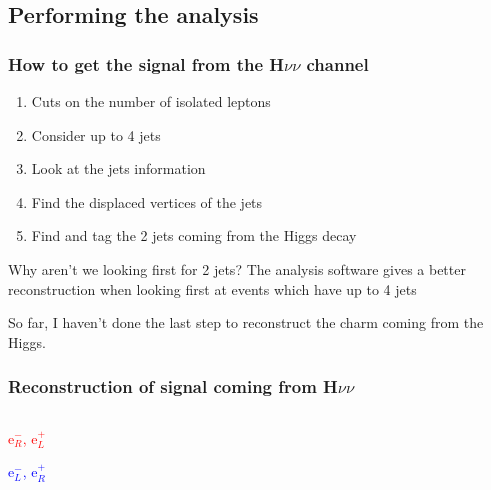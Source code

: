 \documentclass{beamer}
\newcommand{\grille}{
    \begin{tikzpicture}[overlay,remember picture]
        \begin{scope}[shift={(current page.south west)}]
            \draw[gray!50] (0,0) grid[step=2mm] (current page.north east);
            \draw[red!50] (0,0) grid[step=1cm] (current page.north east);
            \draw (0.2,1) node {1};
            \draw (0.2,2) node {2};
            \draw (0.2,3) node {3};
            \draw (0.2,4) node {4};
            \draw (0.2,5) node {5};
            \draw (0.2,6) node {6};
            \draw (0.2,7) node {7};
            \draw (0.2,8) node {8};
            \draw (0.2,9) node {9};
            \draw (1,0.5) node {1};
            \draw (2,0.5) node {2};
            \draw (3,0.5) node {3};
            \draw (4,0.5) node {4};
            \draw (5,0.5) node {5};
            \draw (6,0.5) node {6};
            \draw (7,0.5) node {7};
            \draw (8,0.5) node {8};
            \draw (9,0.5) node {9};
            \draw (10,0.5) node {10};
            \draw (11,0.5) node {11};
            \draw (12,0.5) node {12};
        \end{scope}
    \end{tikzpicture}
}
\begin{document}
\subsection{Performing the analysis}
\begin{frame}
    \frametitle{How to get the signal from the H$\nu\nu$ channel}

    \begin{enumerate}
        \item Cuts on the number of isolated leptons
        \item Consider up to 4 jets
        \item Look at the jets information
        \item Find the displaced vertices of the jets
        \item Find and tag the 2 jets coming from the Higgs decay
    \end{enumerate}

    \begin{block}{Why aren't we looking first for 2 jets?}
        The analysis software gives a better reconstruction when looking first at events which have up to 4 jets
    \end{block}

    \begin{center}
        So far, I haven't done the last step to reconstruct the charm coming from the Higgs.
    \end{center}
\end{frame}

\begin{frame}[label=signalReconstruction]
    \frametitle{Reconstruction of signal coming from H$\nu\nu$}
    \begin{columns}[c]
        \begin{column}{4cm}
        \end{column}
        \begin{column}{4cm}
        \end{column}
        \begin{column}{4cm}
        \end{column}
    \end{columns}

    \begin{center}
        \textcolor{red}{e$^-_R$, e$^+_L$}

        \textcolor{blue}{e$^-_L$, e$^+_R$}
    \end{center}

\end{frame}
\end{document}
